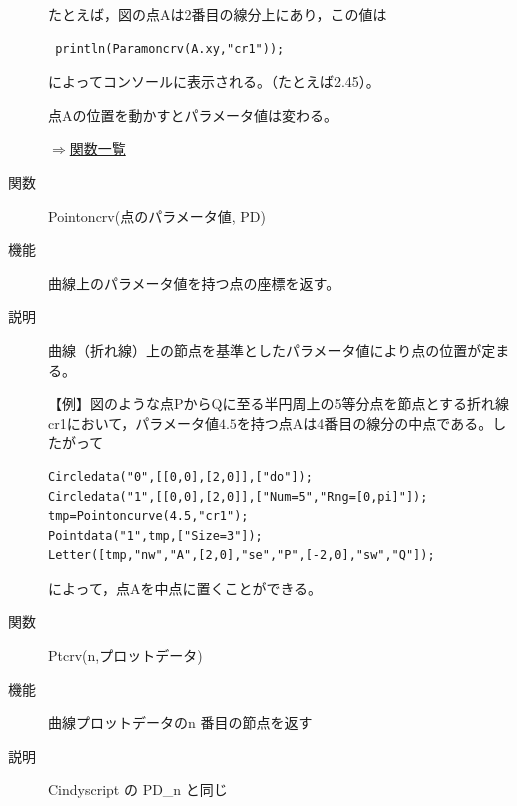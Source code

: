 \documentclass[papersize,a4paper,12pt,uplatex]{jsarticle}
\begin{document}
\begin{description}
たとえば，図の点$\mathrm{A}$は2番目の線分上にあり，この値は

\begin{verbatim}
 println(Paramoncrv(A.xy,"cr1"));
\end{verbatim}

によってコンソールに表示される。（たとえば2.45）。

点Aの位置を動かすとパラメータ値は変わる。

\vspace{\baselineskip}
\begin{center}
 
\end{center}

\begin{flushright}\hyperlink{functionlist}{$\Rightarrow$関数一覧}\end{flushright}


\vspace{\baselineskip}
\hypertarget{pointoncrv}{}
\item[関数]Pointoncrv(点のパラメータ値, PD)
\item[機能]曲線上のパラメータ値を持つ点の座標を返す。
\item[説明]曲線（折れ線）上の節点を基準としたパラメータ値により点の位置が定まる。

\vspace{\baselineskip}
【例】図のような点$\mathrm{P}$から$\mathrm{Q}$に至る半円周上の5等分点を節点とする折れ線cr1において，パラメータ値$4.5$を持つ点$\mathrm{A}$は4番目の線分の中点である。したがって

\begin{verbatim}
Circledata("0",[[0,0],[2,0]],["do"]);
Circledata("1",[[0,0],[2,0]],["Num=5","Rng=[0,pi]"]);
tmp=Pointoncurve(4.5,"cr1");
Pointdata("1",tmp,["Size=3"]);
Letter([tmp,"nw","A",[2,0],"se","P",[-2,0],"sw","Q"]);
\end{verbatim}

によって，点Aを中点に置くことができる。

\vspace{\baselineskip}
 \begin{center} \scalebox{0.9}{} \end{center}

\hypertarget{ptcrv}{}
\item[関数]Ptcrv(n,プロットデータ)
\item[機能]曲線プロットデータのn 番目の節点を返す
\item[説明]Cindyscript の PD\_n と同じ


\end{description}
\end{document}
